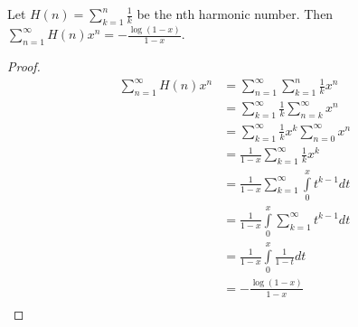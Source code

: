 \begin{proposition}
Let \(H(n) = \sum\limits_{k=1}^n \frac{1}{k}\) be the nth harmonic number.
Then \(\sum\limits_{n=1}^\infty H(n) x^n = -\frac{\log(1 - x)}{1 - x}\).
\end{proposition}

\begin{proof}
\begin{align*}
\sum\limits_{n=1}^\infty H(n) x^n & = \sum\limits_{n=1}^\infty \sum\limits_{k=1}^n \frac{1}{k} x^n \\
& = \sum\limits_{k=1}^\infty \frac{1}{k} \sum\limits_{n=k}^\infty x^n \\
& = \sum\limits_{k=1}^\infty \frac{1}{k} x^k \sum\limits_{n=0}^\infty x^n \\
& = \frac{1}{1 - x} \sum\limits_{k=1}^\infty \frac{1}{k} x^k \\
& = \frac{1}{1 - x} \sum\limits_{k=1}^\infty \int\limits_0^x t^{k - 1} dt \\
& = \frac{1}{1 - x} \int\limits_0^x  \sum\limits_{k=1}^\infty t^{k - 1} dt \\
& = \frac{1}{1 - x} \int\limits_0^x \frac{1}{1 - t} dt \\
& = - \frac{\log(1 - x)}{1 - x} \\
\end{align*}
\end{proof}

